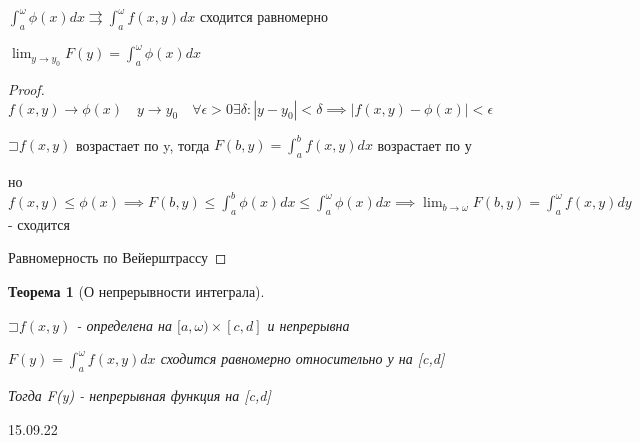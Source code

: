 \documentclass[a4paper, 12pt]{article}
\newcommand\letsymbol{\mathord{\sqsupset}}
\newtheorem{theorem}{Теорема}[section]
\theoremstyle{definition}
\theoremstyle{remark}
\begin{document}
$\int_a^\omega \phi(x)dx\rightrightarrows\int_a^\omega f(x,y)dx$ сходится равномерно

$\lim_{y \to y_0} F(y) = \int_a^\omega \phi(x)dx$
\begin{proof}
     $f(x,y)\to \phi(x)\quad y\to y_0 \quad \forall\epsilon>0\exists\delta: |y - y_0|< \delta\implies |f(x,y) - \phi(x)|< \epsilon$

     $\letsymbol{} f(x,y)$ возрастает по y, тогда $F(b, y) = \int_a^b f(x,y)dx$ возрастает по у

     но $f(x,y)\leq\phi(x)\implies F(b, y)\leq \int_a^b \phi(x)dx \leq \int_a^\omega \phi(x)dx\implies \lim_{b \to \omega} F(b,y) = \int_a^\omega f(x,y)dy$ - сходится

     Равномерность по Вейерштрассу
\end{proof}
\begin{theorem}[О непрерывности интеграла] \hypertarget{p5}{}
     $\letsymbol f(x,y)$ - определена на $[a,\omega)\times[c, d]$ и непрерывна

     $F(y) = \int_a^\omega f(x,y)dx$ сходится равномерно относительно у на [c,d]

     Тогда F(y) - непрерывная функция на [c,d]
\end{theorem}
15.09.22
\end{document}
